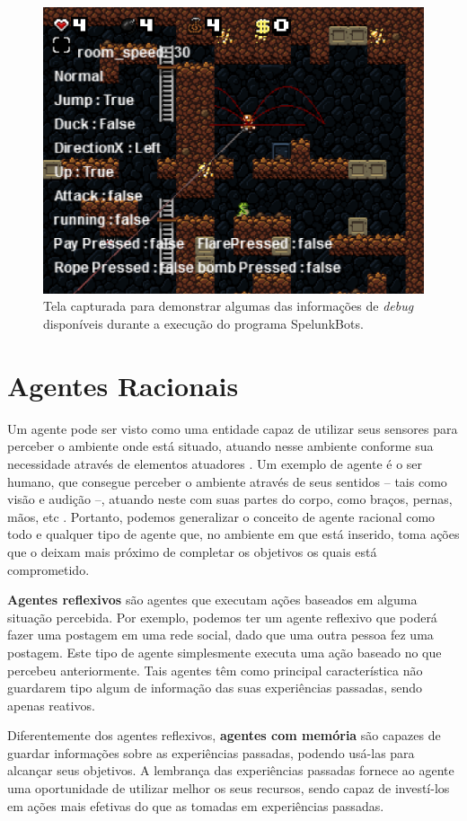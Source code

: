 \begin{figure}[htb!]
\centering\includegraphics[width=.65\textwidth]{fig/spelunkbots-debug-screen.png}
\caption {\label{fig:spelunkbots-debug-screen}Tela capturada para demonstrar
algumas das informações de \textit{debug} disponíveis durante a execução do
programa SpelunkBots.} \end{figure}


\section{\label{section:agents}Agentes Racionais}
Um agente pode ser visto como uma entidade capaz de utilizar seus sensores para
perceber o ambiente onde está situado, atuando nesse ambiente conforme sua
necessidade através de elementos atuadores \cite[cap.
2]{RussellNorvig200912}.  Um exemplo de agente é o ser humano, que
consegue perceber o ambiente através de seus sentidos -- tais como visão e
audição --, atuando neste com suas partes do corpo, como braços, pernas, mãos,
etc \cite[cap. 2]{RussellNorvig200912}.  Portanto, podemos generalizar o
conceito de agente racional como todo e qualquer tipo de agente que, no
ambiente em que está inserido, toma ações que o deixam mais próximo de
completar os objetivos os quais está comprometido.

\textbf{Agentes reflexivos} são agentes que executam ações baseados em alguma
situação percebida. Por exemplo, podemos ter um agente reflexivo que poderá
fazer uma postagem em uma rede social, dado que uma outra pessoa fez uma
postagem. Este tipo de agente simplesmente executa uma ação baseado no que
percebeu anteriormente. Tais agentes têm como principal característica não
guardarem tipo algum de informação das suas experiências passadas, sendo apenas
reativos.

Diferentemente dos agentes reflexivos, \textbf{agentes com memória} são capazes
de guardar informações sobre as experiências passadas, podendo usá-las para
alcançar seus objetivos. A lembrança das experiências passadas fornece ao
agente uma oportunidade de utilizar melhor os seus recursos, sendo capaz de
investí-los em ações mais efetivas do que as tomadas em experiências passadas.

